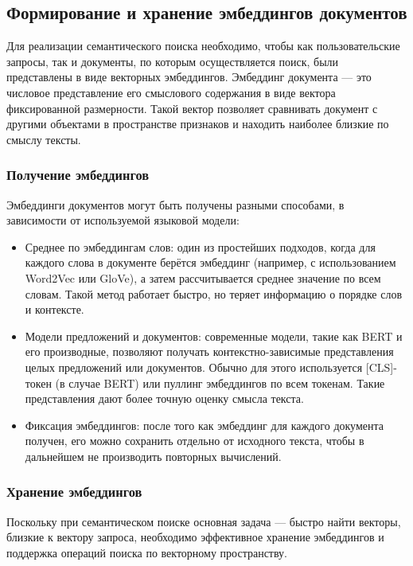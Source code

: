 \documentclass[coursework]{SCWorks}
\begin{document}
\subsection{Формирование и хранение эмбеддингов документов}

Для реализации семантического поиска необходимо, чтобы как пользовательские запросы, так и документы, по которым осуществляется поиск, были представлены в виде векторных эмбеддингов. Эмбеддинг документа — это числовое представление его смыслового содержания в виде вектора фиксированной размерности. Такой вектор позволяет сравнивать документ с другими объектами в пространстве признаков и находить наиболее близкие по смыслу тексты.

\subsubsection{Получение эмбеддингов}
Эмбеддинги документов могут быть получены разными способами, в зависимости от используемой языковой модели:
\begin{itemize}
    \item 
    Среднее по эмбеддингам слов: один из простейших подходов, когда для каждого слова в документе берётся эмбеддинг (например, с использованием Word2Vec или GloVe), а затем рассчитывается среднее значение по всем словам. Такой метод работает быстро, но теряет информацию о порядке слов и контексте.
    
    \item Модели предложений и документов: современные модели, такие как BERT и его производные, позволяют получать контекстно-зависимые представления целых предложений или документов. Обычно для этого используется [CLS]-токен (в случае BERT) или пуллинг эмбеддингов по всем токенам. Такие представления дают более точную оценку смысла текста.
    
    \item Фиксация эмбеддингов: после того как эмбеддинг для каждого документа получен, его можно сохранить отдельно от исходного текста, чтобы в дальнейшем не производить повторных вычислений.
\end{itemize}

\subsubsection{Хранение эмбеддингов}
Поскольку при семантическом поиске основная задача — быстро найти векторы, близкие к вектору запроса, необходимо эффективное хранение эмбеддингов и поддержка операций поиска по векторному пространству.
\end{document}
